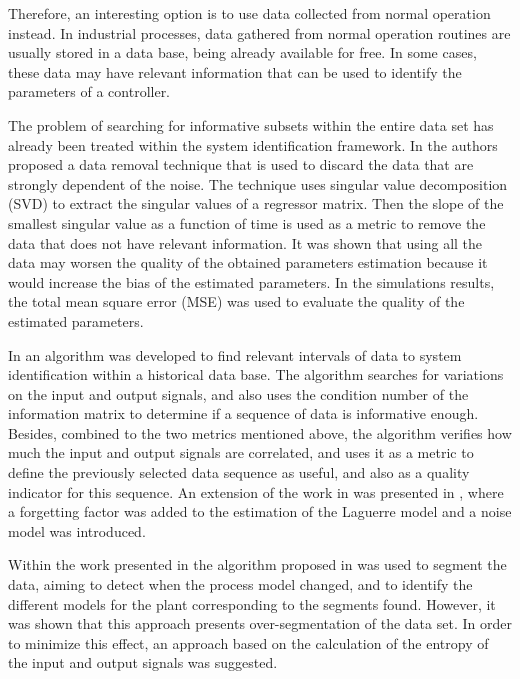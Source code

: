 \documentclass[letterpaper, 10 pt, conference]{ieeeconf}  %
\begin{document}
Therefore, an interesting option is to use data collected from normal operation instead.
In industrial processes, data gathered from normal operation routines are usually stored in a data base, being already available for free.
In some cases, these data may have relevant information that can be used to identify the parameters of a controller.

The problem of searching for informative subsets within the entire data set has already been treated within the system identification framework.
In \cite{carrette1996discarding} the authors proposed a data removal technique that is used to discard the data that are strongly dependent of the noise.
The technique uses singular value decomposition (SVD) to extract the singular values of a regressor matrix.
Then the slope of the smallest singular value as a function of time is used as a metric to remove the data that does not have relevant information.
It was shown that using all the data may worsen the quality of the obtained parameters estimation because it would increase the bias of the estimated parameters.
In the simulations results, the total mean square error (MSE) was used to evaluate the quality of the estimated parameters.

In \cite{peretzki2011data} an algorithm was developed to find relevant intervals of data to system identification within a historical data base.
The algorithm searches for variations on the input and output signals, and also uses the condition number of the information matrix to determine if a sequence of data is informative enough.
Besides, combined to the two metrics mentioned above, the algorithm verifies how much the input and output signals are correlated, and uses it as a metric to define the previously selected data sequence as useful, and also as a quality indicator for this sequence.
An extension of the work in \cite{peretzki2011data} was presented in \cite{bittencourt2015algorithm}, where a forgetting factor was added to the estimation of the Laguerre model and a noise model was introduced.

Within the work presented in \cite{shardt2014segmentation} the algorithm proposed in \cite{peretzki2011data} was used to segment the data, aiming to detect when the process model changed, and to identify the different models for the plant corresponding to the segments found.
However, it was shown that this approach presents over-segmentation of the data set.
In order to minimize this effect, an approach based on the calculation of the entropy of the input and output signals was suggested.
\end{document}
